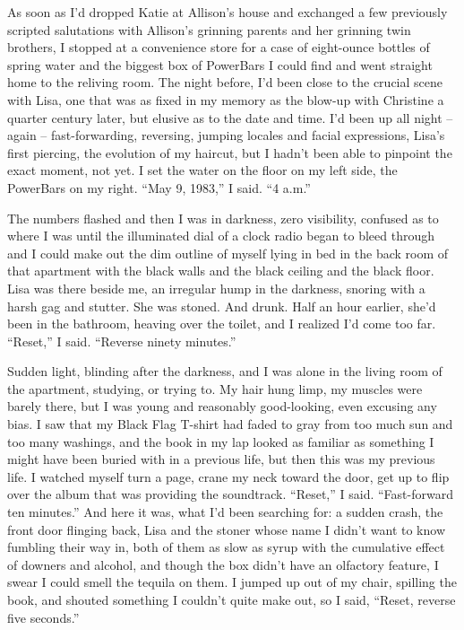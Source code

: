 \documentclass[11pt,a4paper]{article}
\newcommand{\qm}[1]{“#1”}
\begin{document}
As soon as I'd dropped Katie at Allison's house and exchanged a few previously scripted salutations with Allison's grinning parents and her grinning twin brothers, I stopped at a convenience store for a case of eight-ounce bottles of spring water and the biggest box of PowerBars I could find and went straight home to the reliving room. The night before, I'd been close to the crucial scene with Lisa, one that was as fixed in my memory as the blow-up with Christine a quarter century later, but elusive as to the date and time. I'd been up all night – again – fast-forwarding, reversing, jumping locales and facial expressions, Lisa's first piercing, the evolution of my haircut, but I hadn't been able to pinpoint the exact moment, not yet. I set the water on the floor on my left side, the PowerBars on my right. \qm{May 9, 1983,} I said. \qm{4 a.m.}

The numbers flashed and then I was in darkness, zero visibility, confused as to where I was until the illuminated dial of a clock radio began to bleed through and I could make out the dim outline of myself lying in bed in the back room of that apartment with the black walls and the black ceiling and the black floor. Lisa was there beside me, an irregular hump in the darkness, snoring with a harsh gag and stutter. She was stoned. And drunk. Half an hour earlier, she'd been in the bathroom, heaving over the toilet, and I realized I'd come too far. \qm{Reset,} I said. \qm{Reverse ninety minutes.}

Sudden light, blinding after the darkness, and I was alone in the living room of the apartment, studying, or trying to. My hair hung limp, my muscles were barely there, but I was young and reasonably good-looking, even excusing any bias. I saw that my Black Flag T-shirt had faded to gray from too much sun and too many washings, and the book in my lap looked as familiar as something I might have been buried with in a previous life, but then this was my previous life. I watched myself turn a page, crane my neck toward the door, get up to flip over the album that was providing the soundtrack. \qm{Reset,} I said. \qm{Fast-forward ten minutes.} And here it was, what I'd been searching for: a sudden crash, the front door flinging back, Lisa and the stoner whose name I didn't want to know fumbling their way in, both of them as slow as syrup with the cumulative effect of downers and alcohol, and though the box didn't have an olfactory feature, I swear I could smell the tequila on them. I jumped up out of my chair, spilling the book, and shouted something I couldn't quite make out, so I said, \qm{Reset, reverse five seconds.}
\end{document}
